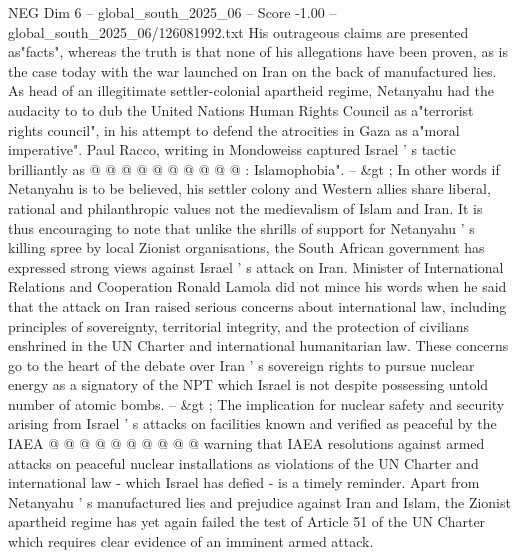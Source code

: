 \begin{textsample}{NEG Dim 6 – global\_south\_2025\_06 – Score -1.00 – global\_south\_2025\_06/126081992.txt}
His outrageous claims are presented as"facts", whereas the truth is that none of his allegations have been proven, as is the case today with the war launched on Iran on the back of manufactured lies.
As head of an illegitimate settler-colonial apartheid regime, Netanyahu had the audacity to to dub the United Nations Human Rights Council as a"terrorist rights council", in his attempt to defend the atrocities in Gaza as a"moral imperative".
Paul Racco, writing in Mondoweiss captured Israel ' s tactic brilliantly as @ @ @ @ @ @ @ @ @ @ : Islamophobia". -- \&gt ; In other words if Netanyahu is to be believed, his settler colony and Western allies share liberal, rational and philanthropic values not the medievalism of Islam and Iran.
It is thus encouraging to note that unlike the shrills of support for Netanyahu ' s killing spree by local Zionist organisations, the South African government has expressed strong views against Israel ' s attack on Iran.
Minister of International Relations and Cooperation Ronald Lamola did not mince his words when he said that the attack on Iran raised serious concerns about international law, including principles of sovereignty, territorial integrity, and the protection of civilians enshrined in the UN Charter and international humanitarian law.
These concerns go to the heart of the debate over Iran ' s sovereign rights to pursue nuclear energy as a signatory of the NPT which Israel is not despite possessing untold number of atomic bombs. -- \&gt ; The implication for nuclear safety and security arising from Israel ' s attacks on facilities known and verified as peaceful by the IAEA @ @ @ @ @ @ @ @ @ @ warning that IAEA resolutions against armed attacks on peaceful nuclear installations as violations of the UN Charter and international law - which Israel has defied - is a timely reminder.
Apart from Netanyahu ' s manufactured lies and prejudice against Iran and Islam, the Zionist apartheid regime has yet again failed the test of Article 51 of the UN Charter which requires clear evidence of an imminent armed attack.

\end{textsample}
